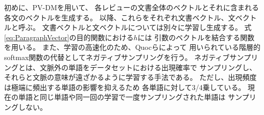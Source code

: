 初めに、PV-DMを用いて、
各レビューの文書全体のベクトルとそれに含まれる各文のベクトルを生成する。
以降、これらをそれぞれ文書ベクトル、文ベクトルと呼ぶ。
文書ベクトルと文ベクトルについては別々に学習し生成する。
式\ref{eq:ParagraphVector}の目的関数における$h$には
引数のベクトルを結合する関数を用いる。
また、学習の高速化のため、Quocら\cite{quoc14}によって
用いられている階層的softmax関数の代替としてネガティブサンプリングを行う。
ネガティブサンプリングとは、文脈外の単語をデータセットにおける出現確率で
サンプリングし、それらと文脈の意味が遠ざかるように学習する手法である。
ただし、出現頻度は極端に頻出する単語の影響を抑えるため
各単語に対して3/4乗している。
現在の単語と同じ単語や同一回の学習で一度サンプリングされた単語は
サンプリングしない。

